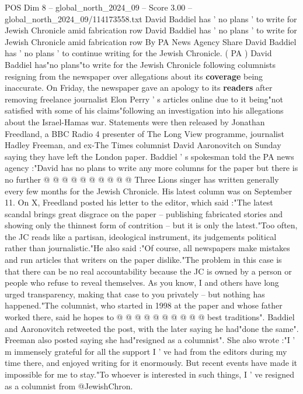 \begin{textsample}{POS Dim 8 – global\_north\_2024\_09 – Score 3.00 – global\_north\_2024\_09/114173558.txt}  \label{ex:f8_pos_300}
David Baddiel has ' no plans ' to write for Jewish Chronicle amid fabrication row David Baddiel has ' no plans ' to write for Jewish Chronicle amid fabrication row By PA News Agency Share David Baddiel has ' no plans ' to continue writing for the Jewish Chronicle. ( PA ) David Baddiel has"no plans"to write for the Jewish Chronicle following columnists resigning from the newspaper over allegations about its \textbf{coverage} being inaccurate.
On Friday, the newspaper gave an apology to its \textbf{readers} after removing freelance journalist Elon Perry ' s articles online due to it being"not satisfied with some of his claims"following an investigation into his allegations about the Israel-Hamas war.
Statements were then released by Jonathan Freedland, a BBC Radio 4 presenter of The Long View programme, journalist Hadley Freeman, and ex-The Times columnist David Aaronovitch on Sunday saying they have left the London paper.
Baddiel ' s spokesman told the PA news agency :"David has no plans to write any more columns for the paper but there is no further @ @ @ @ @ @ @ @ @ @ Three Lions singer has written generally every few months for the Jewish Chronicle.
His latest column was on September 11.
On X, Freedland posted his letter to the editor, which said :"The latest scandal brings great disgrace on the paper -- publishing fabricated stories and showing only the thinnest form of contrition -- but it is only the latest."Too often, the JC reads like a partisan, ideological instrument, its judgements political rather than journalistic."He also said :"Of course, all newspapers make mistakes and run articles that writers on the paper dislike."The problem in this case is that there can be no real accountability because the JC is owned by a person or people who refuse to reveal themselves.
As you know, I and others have long urged transparency, making that case to you privately -- but nothing has happened."The columnist, who started in 1998 at the paper and whose father worked there, said he hopes to @ @ @ @ @ @ @ @ @ @ best traditions".
Baddiel and Aaronovitch retweeted the post, with the later saying he had"done the same".
Freeman also posted saying she had"resigned as a columnist".
She also wrote :"I ' m immensely grateful for all the support I ' ve had from the editors during my time there, and enjoyed writing for it enormously.
But recent events have made it impossible for me to stay."To whoever is interested in such things, I ' ve resigned as a columnist from @JewishChron.

\end{textsample}
